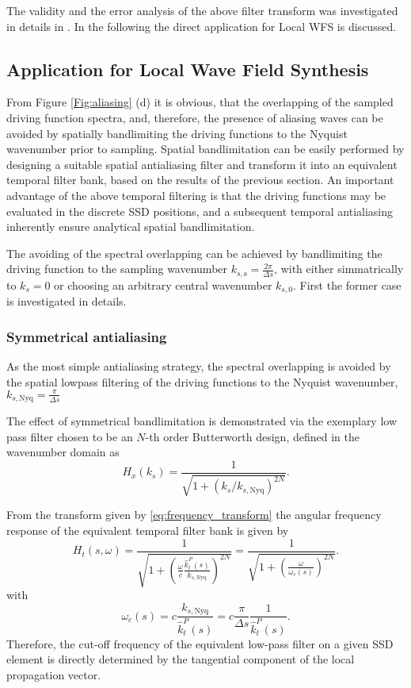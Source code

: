 \documentclass[conference]{IEEEtran}
\begin{document}
The validity and the error analysis of the above filter transform was investigated in details in \cite{Firtha DAGA2023}.
In the following the direct application for Local WFS is discussed. 

\subsection{Application for Local Wave Field Synthesis}

From Figure \ref{Fig:aliasing} (d) it is obvious, that the overlapping of the sampled driving function spectra, and, therefore, the presence of aliasing waves can be avoided by spatially bandlimiting the driving functions to the Nyquist wavenumber prior to sampling.
Spatial bandlimitation can be easily performed by designing a suitable spatial antialiasing filter and transform it into an equivalent temporal filter bank, based on the results of the previous section.
An important advantage of the above temporal filtering is that the driving functions may be evaluated in the discrete SSD positions, and a subsequent temporal antialiasing inherently ensure analytical spatial bandlimitation.

The avoiding of the spectral overlapping can be achieved by bandlimiting the driving function to the sampling wavenumber $k_{s,\mathrm{s}} = \frac{2\pi}{\Delta s}$, with either simmatrically to $k_s = 0$ or choosing an arbitrary central wavenumber $k_{s,0}$.
First the former case is investigated in details.

\subsubsection{Symmetrical antialiasing}
As the most simple antialiasing strategy, the spectral overlapping is avoided by the spatial lowpass filtering of the driving functions to the Nyquist wavenumber, $k_{s,\mathrm{Nyq}} = \frac{\pi}{\Delta s}$

The effect of symmetrical bandlimitation is demonstrated via the exemplary low pass filter chosen to be an $N$-th order Butterworth design, defined in the wavenumber domain as
\begin{equation}
    H_x(k_s) = \frac{ 1 }{ \sqrt{ 1 + \left( k_s / k_{s,\mathrm{Nyq}} \right)^{2N} } }.
\end{equation}

From the transform given by \eqref{eq:frequency_transform} the angular frequency response of the equivalent temporal filter bank is given by
\begin{equation}
    H_t(s,\omega) = \frac{ 1 }{ \sqrt{ 1 + \left( \frac{\omega}{c}\frac{\hat{k}_t^P(s)}{k_{s,\mathrm{Nyq}}}  \right)^{2N} } } =  \frac{ 1 }{ \sqrt{ 1 + \left( \frac{\omega}{\omega_c(s)}  \right)^{2N} } } .
\end{equation}
with 
\begin{equation}
    \omega_c(s) = c \frac{k_{s,\mathrm{Nyq}}}{\hat{k}_t^P(s)} = c\frac{ \pi}{\Delta s} \frac{1}{\hat{k}_t^P(s)}.
    \label{eq:cutoff_fr}
\end{equation}
Therefore, the cut-off frequency of the equivalent low-pass filter on a given SSD element is directly determined by the tangential component of the local propagation vector.
\end{document}
